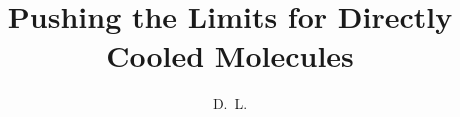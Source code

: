 \documentclass[defaultstyle,11pt]{thesis}
\title{Pushing the Limits for Directly Cooled Molecules}
\author{D.~L.}{Reens}
\begin{document}










\nocite{*}		%

\appendix


\end{document}
